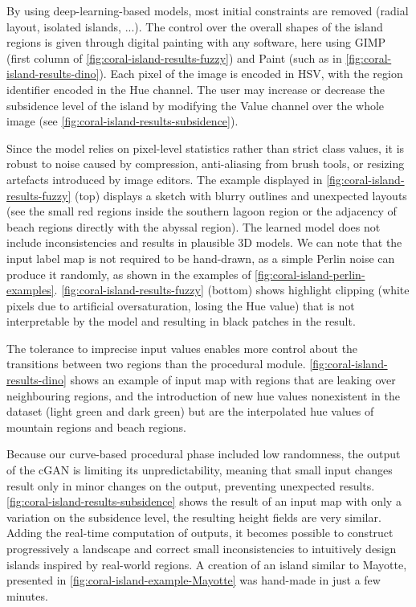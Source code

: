 By using deep-learning-based models, most initial constraints are removed (radial layout, isolated islands, ...). The control over the overall shapes of the island regions is given through digital painting with any software, here using GIMP (first column of \cref{fig:coral-island-results-fuzzy}) and Paint (such as in \cref{fig:coral-island-results-dino}). Each pixel of the image is encoded in HSV, with the region identifier encoded in the Hue channel. The user may increase or decrease the subsidence level of the island by modifying the Value channel over the whole image (see \cref{fig:coral-island-results-subsidence}).

Since the model relies on pixel-level statistics rather than strict class values, it is robust to noise caused by compression, anti-aliasing from brush tools, or resizing artefacts introduced by image editors. The example displayed in \cref{fig:coral-island-results-fuzzy} (top) displays a sketch with blurry outlines and unexpected layouts (see the small red regions inside the southern lagoon region or the adjacency of beach regions directly with the abyssal region). The learned model does not include inconsistencies and results in plausible 3D models. We can note that the input label map is not required to be hand-drawn, as a simple Perlin noise can produce it randomly, as shown in the examples of \cref{fig:coral-island-perlin-examples}. \cref{fig:coral-island-results-fuzzy} (bottom) shows highlight clipping (white pixels due to artificial oversaturation, losing the Hue value) that is not interpretable by the model and resulting in black patches in the result. 

The tolerance to imprecise input values enables more control about the transitions between two regions than the procedural module. \cref{fig:coral-island-results-dino} shows an example of input map with regions that are leaking over neighbouring regions, and the introduction of new hue values nonexistent in the dataset (light green and dark green) but are the interpolated hue values of mountain regions and beach regions.

Because our curve-based procedural phase included low randomness, the output of the cGAN is limiting its unpredictability, meaning that small input changes result only in minor changes on the output, preventing unexpected results. \cref{fig:coral-island-results-subsidence} shows the result of an input map with only a variation on the subsidence level, the resulting height fields are very similar. Adding the real-time computation of outputs, it becomes possible to construct progressively a landscape and correct small inconsistencies to intuitively design islands inspired by real-world regions. A creation of an island similar to Mayotte, presented in \cref{fig:coral-island-example-Mayotte} was hand-made in just a few minutes. 

